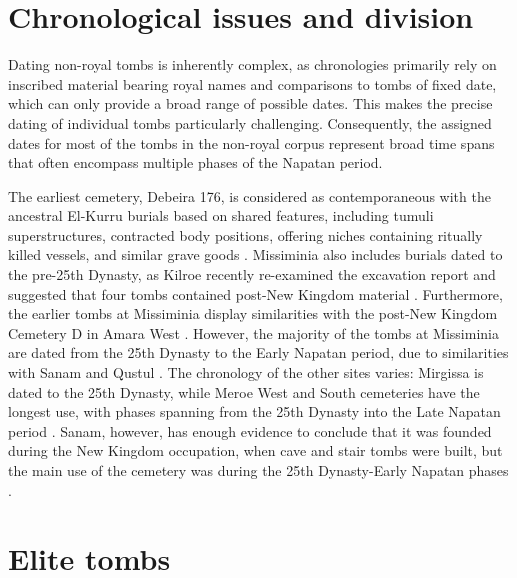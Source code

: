 \section{Chronological issues and division}

Dating non-royal tombs is inherently complex, as chronologies primarily rely on inscribed material bearing royal names and comparisons to tombs of fixed date, which can only provide a broad range of possible dates. This makes the precise dating of individual tombs particularly challenging. Consequently, the assigned dates for most of the tombs in the non-royal corpus represent broad time spans that often encompass multiple phases of the Napatan period.


The earliest cemetery, Debeira 176, is considered as contemporaneous with the ancestral El-Kurru burials based on shared features, including tumuli superstructures, contracted body positions, offering niches containing ritually killed vessels, and similar grave goods \parencites[p.~200-202]{säve-söderberghScandinavianJointExpedition1989a}[p.~309-309]{törökTwoWorldsFrontier2009}[p.~631]{lohwasserNapatanNecropoleisBurial2019}. Missiminia also includes burials dated to the pre-25th Dynasty, as Kilroe recently re-examined the excavation report and suggested that four tombs contained post-New Kingdom material \parencites[p.~251]{kilroePilgrimFlasksChronological2019}. Furthermore, the earlier tombs at Missiminia display similarities with the post-New Kingdom Cemetery D in Amara West \parencites[p.~57]{binderCemeteryAmaraWest2011}. However, the majority of the tombs at Missiminia are dated from the 25th Dynasty to the Early Napatan period, due to similarities with Sanam and Qustul \parencites{williamsExcavationsAbuSimbel1990} [p.~300-301]{lohwasserAspekteNapatanischenGesellschaft2012}. The chronology of the other sites varies: Mirgissa is dated to the 25th Dynasty, while Meroe West and South cemeteries have the longest use, with phases spanning from the 25th Dynasty into the Late Napatan period \parencites{dunhamWestSouthCemeteries1963, geusCimetièreXXVèmeDynastie1975}. Sanam, however, has enough evidence to conclude that it was founded during the New Kingdom occupation, when cave and stair tombs were built, but the main use of the cemetery was during the 25th Dynasty-Early Napatan phases \parencites{lohwasserAspekteNapatanischenGesellschaft2012}.


\section{Elite tombs}


